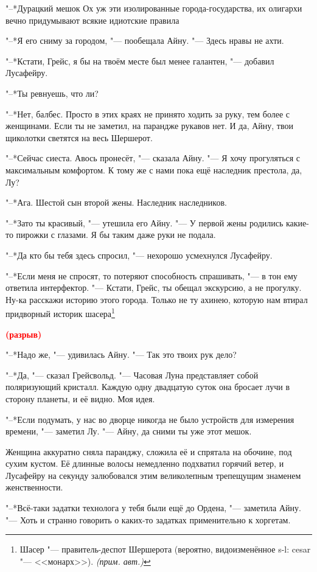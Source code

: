 \documentclass[a4paper,10pt,fleqn]{book}
\newcommand{\ldotst}{\so{...}\xspace}
\newcommand{\spacing}{\textcolor{red}{\textbf{(разрыв)}}}
\newcommand{\authornote}{\textit{(прим. авт.)}}
\begin{document}
"--*Дурацкий мешок\ldotst
Ох уж эти изолированные города-государства, их олигархи вечно придумывают всякие идиотские правила\ldotst

"--*Я его сниму за городом, "--- пообещала Айну.
"--- Здесь нравы не ахти.

"--*Кстати, Грейс, я бы на твоём месте был менее галантен, "--- добавил Лусафейру.

"--*Ты ревнуешь, что ли?

"--*Нет, балбес.
Просто в этих краях не принято ходить за руку, тем более с женщинами.
Если ты не заметил, на парандже рукавов нет.
И да, Айну, твои щиколотки светятся на весь Шершерот.

"--*Сейчас сиеста.
Авось пронесёт, "--- сказала Айну.
"--- Я хочу прогуляться с максимальным комфортом.
К тому же с нами пока ещё наследник престола, да, Лу?

"--*Ага.
Шестой сын второй жены.
Наследник наследников.

"--*Зато ты красивый, "--- утешила его Айну.
"--- У первой жены родились какие-то пирожки с глазами.
Я бы таким даже руки не подала.

"--*Да кто бы тебя здесь спросил, "--- нехорошо усмехнулся Лусафейру.

"--*Если меня не спросят, то потеряют способность спрашивать, "--- в тон ему ответила интерфектор.
"--- Кстати, Грейс, ты обещал экскурсию, а не прогулку.
Ну-ка расскажи историю этого города.
Только не ту ахинею, которую нам втирал придворный историк шасера\footnote
{Шасер "--- правитель-деспот Шершерота (вероятно, видоизменённое s-l: cesar "--- <<монарх>>). \authornote}\ldotst

\spacing

"--*Надо же, "--- удивилась Айну.
"--- Так это твоих рук дело?

"--*Да, "--- сказал Грейсвольд.
"--- Часовая Луна представляет собой поляризующий кристалл.
Каждую одну двадцатую суток она бросает лучи в сторону планеты, и её видно.
Моя идея.

"--*Если подумать, у нас во дворце никогда не было устройств для измерения времени, "--- заметил Лу.
"--- Айну, да сними ты уже этот мешок.

Женщина аккуратно сняла паранджу, сложила её и спрятала на обочине, под сухим кустом.
Её длинные волосы немедленно подхватил горячий ветер, и Лусафейру на секунду залюбовался этим великолепным трепещущим знаменем женственности.

"--*Всё-таки задатки технолога у тебя были ещё до Ордена, "--- заметила Айну.
"--- Хоть и странно говорить о каких-то задатках применительно к хоргетам.
\end{document}

